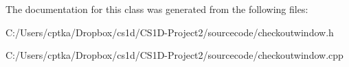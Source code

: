 The documentation for this class was generated from the following files\+:\begin{DoxyCompactItemize}
\item 
C\+:/\+Users/cptka/\+Dropbox/cs1d/\+C\+S1\+D-\/\+Project2/sourcecode/checkoutwindow.\+h\item 
C\+:/\+Users/cptka/\+Dropbox/cs1d/\+C\+S1\+D-\/\+Project2/sourcecode/checkoutwindow.\+cpp\end{DoxyCompactItemize}
